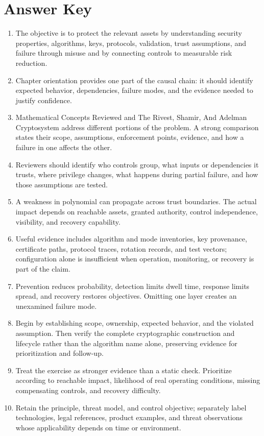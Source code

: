 \documentclass[11pt,letterpaper]{article}
\begin{document}
\section*{Answer Key}
\begin{enumerate}
\item The objective is to protect the relevant assets by understanding security properties, algorithms, keys, protocols, validation, trust assumptions, and failure through misuse and by connecting controls to measurable risk reduction.
\item Chapter orientation provides one part of the causal chain: it should identify expected behavior, dependencies, failure modes, and the evidence needed to justify confidence.
\item Mathematical Concepts Reviewed and The Rivest, Shamir, And Adelman Cryptosystem address different portions of the problem. A strong comparison states their scope, assumptions, enforcement points, evidence, and how a failure in one affects the other.
\item Reviewers should identify who controls group, what inputs or dependencies it trusts, where privilege changes, what happens during partial failure, and how those assumptions are tested.
\item A weakness in polynomial can propagate across trust boundaries. The actual impact depends on reachable assets, granted authority, control independence, visibility, and recovery capability.
\item Useful evidence includes algorithm and mode inventories, key provenance, certificate paths, protocol traces, rotation records, and test vectors; configuration alone is insufficient when operation, monitoring, or recovery is part of the claim.
\item Prevention reduces probability, detection limits dwell time, response limits spread, and recovery restores objectives. Omitting one layer creates an unexamined failure mode.
\item Begin by establishing scope, ownership, expected behavior, and the violated assumption. Then verify the complete cryptographic construction and lifecycle rather than the algorithm name alone, preserving evidence for prioritization and follow-up.
\item Treat the exercise as stronger evidence than a static check. Prioritize according to reachable impact, likelihood of real operating conditions, missing compensating controls, and recovery difficulty.
\item Retain the principle, threat model, and control objective; separately label technologies, legal references, product examples, and threat observations whose applicability depends on time or environment.
\end{enumerate}
\end{document}
